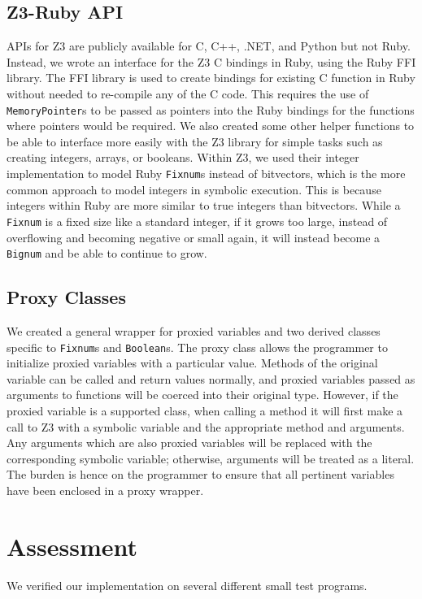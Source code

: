 \documentclass[10pt]{article}
\begin{document}
\subsection{Z3-Ruby API}
APIs for Z3 are publicly available for C, C++, .NET, and Python \textemdash but not Ruby.  Instead, we wrote an interface for the Z3 C bindings in Ruby, using the Ruby FFI library.  The FFI library is used to create bindings for existing C function in Ruby without needed to re-compile any of the C code.  This requires the use of \texttt{MemoryPointer}s to be passed as pointers into the Ruby bindings for the functions where pointers would be required.  We also created some other helper functions to be able to interface more easily with the Z3 library for simple tasks such as creating integers, arrays, or booleans.  Within Z3, we used their integer implementation to model Ruby \texttt{Fixnum}s instead of bitvectors, which is the more common approach to model integers in symbolic execution.  This is because integers within Ruby are more similar to true integers than bitvectors.  While a \texttt{Fixnum} is a fixed size like a standard integer, if it grows too large, instead of overflowing and becoming negative or small again, it will instead become a \texttt{Bignum} and be able to continue to grow.\\

\subsection{Proxy Classes}
We created a general wrapper for proxied variables and two derived classes specific to \texttt{Fixnum}s and \texttt{Boolean}s.  The proxy class allows the programmer to initialize proxied variables with a particular value.  Methods of the original variable can be called and return values normally, and proxied variables passed as arguments to functions will be coerced into their original type.  However, if the proxied variable is a supported class, when calling a method it will first make a call to Z3 with a symbolic variable and the appropriate method and arguments.  Any arguments which are also proxied variables will be replaced with the corresponding symbolic variable; otherwise, arguments will be treated as a literal.  The burden is hence on the programmer to ensure that all pertinent variables have been enclosed in a proxy wrapper.\\

\section{Assessment}
We verified our implementation on several different small test programs.\\
\end{document}
